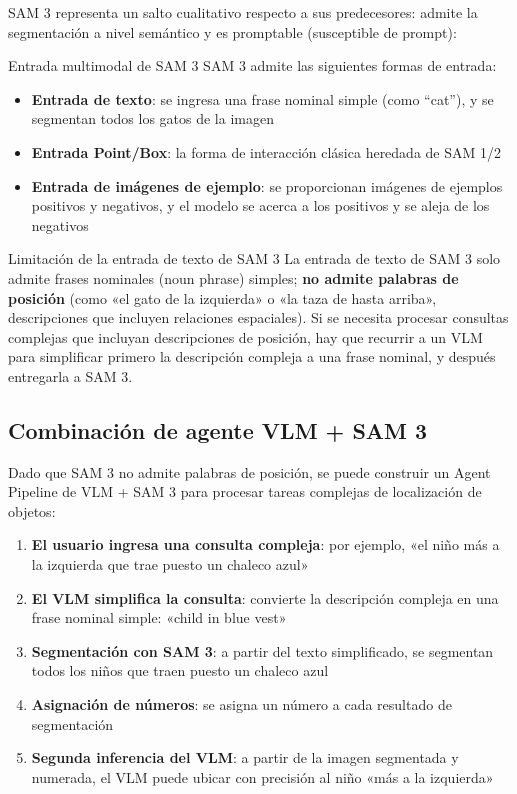 SAM 3 representa un salto cualitativo respecto a sus predecesores: admite la segmentación a nivel semántico y es promptable (susceptible de prompt):

\begin{importantbox}{Entrada multimodal de SAM 3}
SAM 3 admite las siguientes formas de entrada:
\begin{itemize}
    \item \textbf{Entrada de texto}: se ingresa una frase nominal simple (como ``cat''), y se segmentan todos los gatos de la imagen
    \item \textbf{Entrada Point/Box}: la forma de interacción clásica heredada de SAM 1/2
    \item \textbf{Entrada de imágenes de ejemplo}: se proporcionan imágenes de ejemplos positivos y negativos, y el modelo se acerca a los positivos y se aleja de los negativos
\end{itemize}
\end{importantbox}

\begin{warningbox}{Limitación de la entrada de texto de SAM 3}
La entrada de texto de SAM 3 solo admite frases nominales (noun phrase) simples; \textbf{no admite palabras de posición} (como «el gato de la izquierda» o «la taza de hasta arriba», descripciones que incluyen relaciones espaciales). Si se necesita procesar consultas complejas que incluyan descripciones de posición, hay que recurrir a un VLM para simplificar primero la descripción compleja a una frase nominal, y después entregarla a SAM 3.
\end{warningbox}

\subsection{Combinación de agente VLM + SAM 3}

Dado que SAM 3 no admite palabras de posición, se puede construir un Agent Pipeline de VLM + SAM 3 para procesar tareas complejas de localización de objetos:

\begin{enumerate}
    \item \textbf{El usuario ingresa una consulta compleja}: por ejemplo, «el niño más a la izquierda que trae puesto un chaleco azul»
    \item \textbf{El VLM simplifica la consulta}: convierte la descripción compleja en una frase nominal simple: «child in blue vest»
    \item \textbf{Segmentación con SAM 3}: a partir del texto simplificado, se segmentan todos los niños que traen puesto un chaleco azul
    \item \textbf{Asignación de números}: se asigna un número a cada resultado de segmentación
    \item \textbf{Segunda inferencia del VLM}: a partir de la imagen segmentada y numerada, el VLM puede ubicar con precisión al niño «más a la izquierda»
\end{enumerate}

